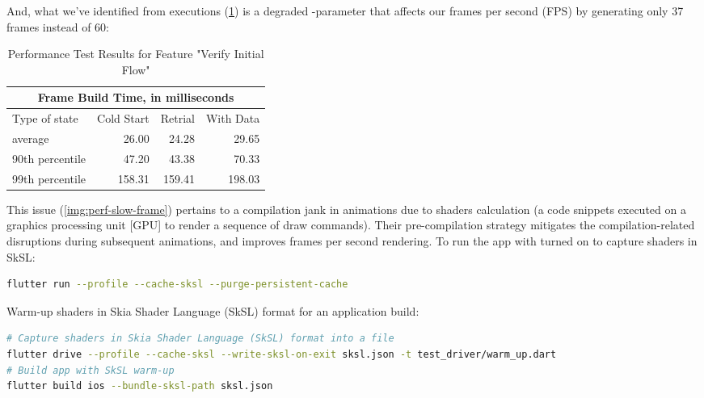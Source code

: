 \noindent And, what we've identified from executions (\cref{tb:frame-build}) is a degraded -parameter 
that affects our frames per second (FPS) by generating only 37 frames instead of 60:\\

\begin{table}[h!]
  \begin{tabular}{ |p{6.8cm}||r|r|r|  }
    \hline
    \multicolumn{4}{|c|}{Frame Build Time, in milliseconds} \\
    \hline
    Type of state & Cold Start & Retrial & With Data\\
    \hline
    average          &  26.00 &  24.28 &  29.65 \\
    90th percentile  &  47.20 &  43.38 &  70.33 \\
    99th percentile  & 158.31 & 159.41 & 198.03 \\
    \hline
  \end{tabular}
  \caption{Performance Test Results for Feature "Verify Initial Flow"} \label{tb:frame-build}
\end{table}


\noindent This issue (\cref{img:perf-slow-frame}) pertains to a compilation jank in animations due to shaders 
calculation (a code snippets executed on a graphics processing unit [GPU] to render a sequence of draw commands). 
Their pre-compilation strategy mitigates the compilation-related disruptions during subsequent animations, and improves 
frames per second rendering. To run the app with  turned on to capture shaders in SkSL:

\begin{lstlisting}[language=bash]
flutter run --profile --cache-sksl --purge-persistent-cache
\end{lstlisting}

\noindent Warm-up shaders in Skia Shader Language (SkSL) format for an application build:

\begin{lstlisting}[language=bash]
# Capture shaders in Skia Shader Language (SkSL) format into a file
flutter drive --profile --cache-sksl --write-sksl-on-exit sksl.json -t test_driver/warm_up.dart
# Build app with SkSL warm-up
flutter build ios --bundle-sksl-path sksl.json
\end{lstlisting}

